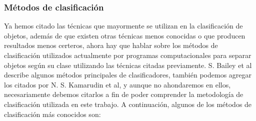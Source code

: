 \documentclass[a4paper,12pt,twoside]{article}
\begin{document}
\subsubsection{Métodos de clasificación}
Ya hemos citado las técnicas que mayormente se utilizan en la clasificación de objetos, además de que existen otras técnicas menos conocidas o que producen resultados menos certeros, ahora hay que hablar sobre los métodos de clasificación utilizados actualmente por programas computacionales para separar objetos según su clase utilizando las técnicas citadas previamente.
S. Bailey et al \cite{bailey} describe algunos métodos principales de clasificadores, también podemos agregar los citados por N. S. Kamarudin et al\cite{kamarudin}, y aunque no ahondaremos en ellos, necesariamente debemos citarlos a fin de poder comprender la metodología de clasificación utilizada en este trabajo. A continuación, algunos de los métodos de clasificación más conocidos son:
\end{document}
